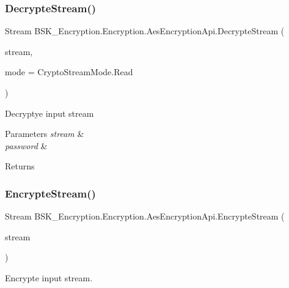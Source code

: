 \subsubsection{\texorpdfstring{Decrypte\+Stream()}{DecrypteStream()}\hspace{0.1cm}{\footnotesize\ttfamily [2/2]}}
{\footnotesize\ttfamily Stream B\+S\+K\+\_\+\+Encryption.\+Encryption.\+Aes\+Encryption\+Api.\+Decrypte\+Stream (\begin{DoxyParamCaption}\item[{Stream}]{stream,  }\item[{Crypto\+Stream\+Mode}]{mode = {\ttfamily CryptoStreamMode.Read} }\end{DoxyParamCaption})}



Decryptye input stream 


\begin{DoxyParams}{Parameters}
{\em stream} & \\
\hline
{\em password} & \\
\hline
\end{DoxyParams}
\begin{DoxyReturn}{Returns}

\end{DoxyReturn}
\mbox{\label{class_b_s_k___encryption_1_1_encryption_1_1_aes_encryption_api_a7a5c47487ff178032ca8c9e4792d0fd5}} 
\subsubsection{\texorpdfstring{Encrypte\+Stream()}{EncrypteStream()}\hspace{0.1cm}{\footnotesize\ttfamily [1/2]}}
{\footnotesize\ttfamily Stream B\+S\+K\+\_\+\+Encryption.\+Encryption.\+Aes\+Encryption\+Api.\+Encrypte\+Stream (\begin{DoxyParamCaption}\item[{Stream}]{stream }\end{DoxyParamCaption})}



Encrypte input stream. 


